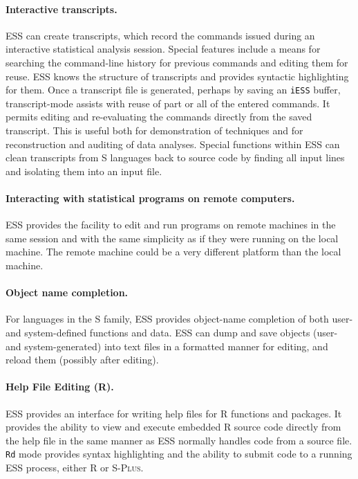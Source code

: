 \documentclass{article}
\newcommand*{\Splus}{\textsc{S-Plus}}
\newcommand{\stexttt}[1]{{\small\texttt{#1}}}
\begin{document}
\paragraph{Interactive transcripts.}
ESS can create transcripts, which record the commands issued during an
interactive statistical analysis session.  Special features include a
means for searching the command-line history for previous commands and
editing them for reuse.  ESS knows the structure of transcripts and
provides syntactic highlighting for them.  Once a transcript file is
generated, perhaps by saving an \stexttt{iESS} buffer, transcript-mode
assists with reuse of part or all of the entered commands.  It permits
editing and re-evaluating the commands directly from the saved
transcript.  This is useful both for demonstration of techniques
and for reconstruction and auditing of data analyses.  Special
functions within ESS can clean transcripts from S languages back to
source code by finding all input lines and isolating them into an
input file.

\paragraph{Interacting with statistical programs on remote computers.}
ESS provides the facility to edit and run programs on remote machines
in the same session and with the same simplicity as if they were
running on the local machine.  The remote machine could be a very
different platform than the local machine.

\paragraph{Object name completion.}
For languages in the S family,
ESS provides object-name completion of both user- and
system-defined functions and data.  ESS can dump and save objects
(user- and system-generated) into text files in a formatted manner for
editing, and reload them (possibly after editing).

\paragraph{Help File Editing (R).}
ESS provides an interface for writing help files for R functions
and packages.  It provides the ability to view and execute embedded R
source code directly from the help file in the same manner as ESS
normally handles code from a source file.  \stexttt{Rd} mode provides
syntax highlighting and the ability to submit code to a running ESS
process, either R or \Splus.
\end{document}
